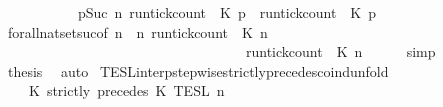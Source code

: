 \begin{isabellebody}
\ \ \ \ \ \ \ \ \ {\isasyminter}\ {\isacharbraceleft}{\isasymrho}{\isachardot}\ {\isasymforall}p{\isasymge}Suc\ n{\isachardot}\ {\isacharparenleft}run{\isacharunderscore}tick{\isacharunderscore}count\ {\isasymrho}\ K\ p{\isacharparenright}\ {\isasymle}\ {\isacharparenleft}run{\isacharunderscore}tick{\isacharunderscore}count\ {\isasymrho}\ K\ p{\isacharparenright}{\isacharbraceright}{\isacartoucheclose}\isanewline
\ \ \ \ \isamarkupfalse%
\ forall{\isacharunderscore}nat{\isacharunderscore}set{\isacharunderscore}suc{\isacharbrackleft}of\ {\isacartoucheopen}n{\isacartoucheclose}\ {\isacartoucheopen}{\isasymlambda}{\isasymrho}\ n{\isachardot}\ {\isacharparenleft}run{\isacharunderscore}tick{\isacharunderscore}count\ {\isasymrho}\ K\ n{\isacharparenright}\isanewline
\ \ \ \ \ \ \ \ \ \ \ \ \ \ \ \ \ \ \ \ \ \ \ \ \ \ \ \ \ \ \ \ \ \ {\isasymle}\ {\isacharparenleft}run{\isacharunderscore}tick{\isacharunderscore}count\ {\isasymrho}\ K\ n{\isacharparenright}{\isacartoucheclose}{\isacharbrackright}\isanewline
\ \ \ \ \isamarkupfalse%
\ simp\isanewline
\ \ \isamarkupfalse%
\ {\isacharquery}thesis\ \isamarkupfalse%
\ auto\isanewline
{}\isamarkupfalse%
%
\endisatagproof
{\isafoldproof}%
%
\isadelimproof
\isanewline
%
\endisadelimproof
\isanewline
{}\isamarkupfalse%
\ TESL{\isacharunderscore}interp{\isacharunderscore}stepwise{\isacharunderscore}strictly{\isacharunderscore}precedes{\isacharunderscore}coind{\isacharunderscore}unfold{\isacharcolon}\isanewline
\ \ \ {\isacartoucheopen}{\isasymlbrakk}\ K\ strictly\ precedes\ K\ {\isasymrbrakk}\isactrlsub T\isactrlsub E\isactrlsub S\isactrlsub L\isactrlbsup {\isasymge}\ n\isactrlesup \ {\isacharequal}\ \ \ \ \ \ \ \ \ \ \ \ \ \ \ %
\end{isabellebody}

